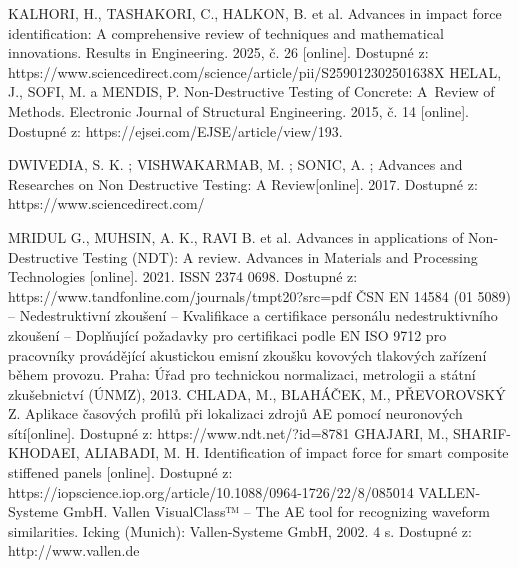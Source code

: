 

\begin{thebibliography}{99}

    KALHORI, H., TASHAKORI, C., HALKON, B. et al. 
    Advances in impact force identification: A comprehensive review of
techniques and mathematical innovations. Results in Engineering. 2025, č. 26 [online]. Dostupné z: https://www.sciencedirect.com/science/article/pii/S259012302501638X
    HELAL, J., SOFI, M. a MENDIS, P. Non-Destructive Testing of Concrete: A~Review of Methods. Electronic Journal of Structural Engineering. 2015, č. 14 [online]. Dostupné z: https://ejsei.com/EJSE/article/view/193.

DWIVEDIA, S. K. ; VISHWAKARMAB, M. ; SONIC, A. ; 
Advances and Researches on Non Destructive Testing: A Review[online]. 2017. Dostupné z: https://www.sciencedirect.com/
 
MRIDUL G., MUHSIN, A. K., RAVI B. et al. Advances in applications of Non-Destructive
Testing (NDT): A review. Advances in
Materials and Processing Technologies [online]. 2021. ISSN 2374 0698. Dostupné z: https://www.tandfonline.com/journals/tmpt20?src=pdf
ČSN EN 14584 (01 5089) – Nedestruktivní zkoušení – Kvalifikace a certifikace personálu nedestruktivního zkoušení – Doplňující požadavky pro certifikaci podle EN ISO 9712 pro pracovníky provádějící akustickou emisní zkoušku kovových tlakových zařízení během provozu.
Praha: Úřad pro technickou normalizaci, metrologii a státní zkušebnictví (ÚNMZ), 2013.
CHLADA, M., BLAHÁČEK, M., PŘEVOROVSKÝ Z. Aplikace časových profilů při lokalizaci zdrojů AE pomocí neuronových sítí[online]. Dostupné z: https://www.ndt.net/?id=8781
GHAJARI, M., SHARIF-KHODAEI, ALIABADI, M. H. Identification of impact force for smart composite stiffened panels [online]. Dostupné z: https://iopscience.iop.org/article/10.1088/0964-1726/22/8/085014
VALLEN-Systeme GmbH. Vallen VisualClass™ – The AE tool for recognizing waveform similarities. Icking (Munich): Vallen-Systeme GmbH, 2002. 4 s. Dostupné z: http://www.vallen.de

\end{thebibliography}


%
%
%
